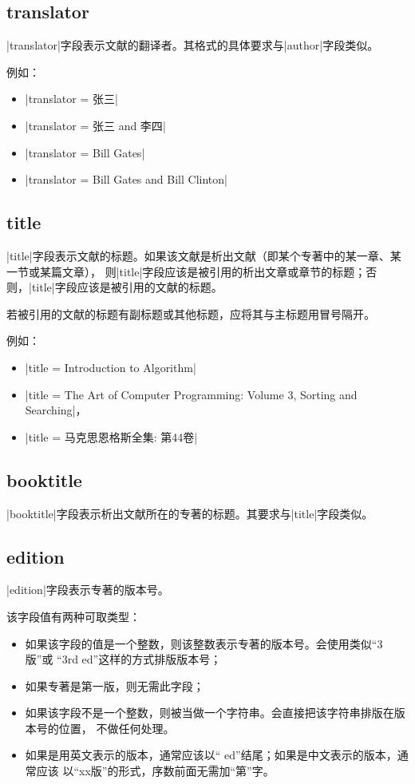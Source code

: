 \subsection{translator}\label{subsec:translator}

|translator|字段表示文献的翻译者。其格式的具体要求与|author|字段类似。

例如：
\begin{itemize}
\item |translator = {张三}|
\item |translator = {张三 and 李四}|
\item |translator = {Bill Gates}|
\item |translator = {Bill Gates and Bill Clinton}|
\end{itemize}

\subsection{title}\label{subsec:bibfield-title}

|title|字段表示文献的标题。如果该文献是析出文献（即某个专著中的某一章、某一节或某篇文章），
则|title|字段应该是被引用的析出文章或章节的标题；否则，|title|字段应该是被引用的文献的标题。

若被引用的文献的标题有副标题或其他标题，应将其与主标题用冒号隔开。

例如：
\begin{itemize}
\item |title = {Introduction to Algorithm}|
\item |title = {The Art of Computer Programming: Volume 3, Sorting and Searching}|，
\item |title = {马克思恩格斯全集: 第44卷}|
\end{itemize}

\subsection{booktitle}\label{subsec:bibfield-booktitle}

|booktitle|字段表示析出文献所在的专著的标题。其要求与|title|字段类似。

\subsection{edition}\label{subsec:bibfield-edition}

|edition|字段表示专著的版本号。

该字段值有两种可取类型：
\begin{itemize}
\item 如果该字段的值是一个整数，则该整数表示专著的版本号。{\BibTeX}会使用类似``3版''或
``3rd ed''这样的方式排版版本号；
\item 如果专著是第一版，则无需此字段；
\item 如果该字段不是一个整数，则被当做一个字符串。{\BibTeX}会直接把该字符串排版在版本号的位置，
不做任何处理。
\item 如果是用英文表示的版本，通常应该以`` ed''结尾；如果是中文表示的版本，通常应该
以``xx版''的形式，序数前面无需加``第''字。
\end{itemize}

